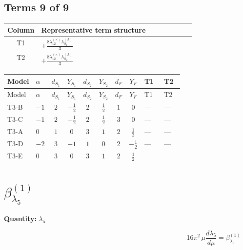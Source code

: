 \documentclass[8pt]{article}
\begin{document}
\begin{landscape}
\subsection*{Terms 9 of 9}
\begin{center}
\begin{tabular}{@{}c >{\raggedright\arraybackslash}p{0.82\linewidth}@{}}
\toprule
Column & Representative term structure \\
\midrule
T1 & \(\displaystyle +\frac{8 {\lambda_{12}^{(\times)}} {\lambda_{S_1}^{(A)}}}{3}\) \\
\midrule
T2 & \(\displaystyle +\frac{8 {\lambda_{12}^{(\times)}} {\lambda_{S_2}^{(A)}}}{3}\) \\
\midrule
\bottomrule
\end{tabular}
\end{center}
\smallskip
\tiny
\begin{longtable}{@{}llcccccc >{\raggedright\arraybackslash}p{0.21\linewidth} >{\raggedright\arraybackslash}p{0.21\linewidth}@{}}
\toprule
Model & $\alpha$ & $d_{S_1}$ & $Y_{S_1}$ & $d_{S_2}$ & $Y_{S_2}$ & $d_F$ & $Y_F$ & T1 & T2 \\
\midrule
\endfirsthead
\toprule
Model & $\alpha$ & $d_{S_1}$ & $Y_{S_1}$ & $d_{S_2}$ & $Y_{S_2}$ & $d_F$ & $Y_F$ & T1 & T2 \\
\midrule
\endhead
T3-B & $-1$ & $2$ & $-\frac{1}{2}$ & $2$ & $\frac{1}{2}$ & $1$ & $0$ & --- & --- \\
\midrule
T3-C & $-1$ & $2$ & $-\frac{1}{2}$ & $2$ & $\frac{1}{2}$ & $3$ & $0$ & --- & --- \\
\midrule
T3-A & $0$ & $1$ & $0$ & $3$ & $1$ & $2$ & $\frac{1}{2}$ & --- & --- \\
\midrule
T3-D & $-2$ & $3$ & $-1$ & $1$ & $0$ & $2$ & $-\frac{1}{2}$ & --- & --- \\
\midrule
T3-E & $0$ & $3$ & $0$ & $3$ & $1$ & $2$ & $\frac{1}{2}$ & \scriptsize\adjustbox{max width=\linewidth}{$\begin{gathered} +\frac{8 {\lambda_{12}^{(\times)}} {\lambda_{S_1}^{(A)}}}{3}\end{gathered}$} & \scriptsize\adjustbox{max width=\linewidth}{$\begin{gathered} +\frac{8 {\lambda_{12}^{(\times)}} {\lambda_{S_2}^{(A)}}}{3}\end{gathered}$} \\
\midrule
\bottomrule
\end{longtable}
\clearpage
\section*{$\beta_{\lambda_5}^{(1)}$}
\noindent\textbf{Quantity: }$\lambda_5$\par\smallskip
\[16\pi^2\,\mu\frac{d \lambda_5}{d\mu}=\beta_{\lambda_5}^{(1)}\]

\end{landscape}
\end{document}
